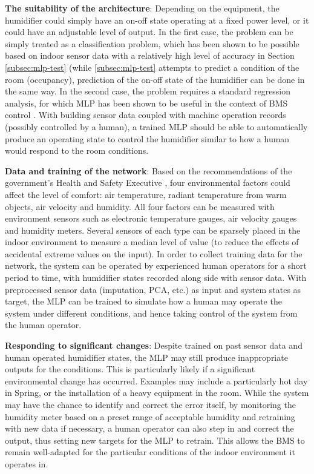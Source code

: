 \documentclass[10pt, oneside]{article}
\begin{document}
\textbf{The suitability of the architecture}: Depending on the equipment, the humidifier could simply have an on-off state operating at a fixed power level, or it could have an adjustable level of output. In the first case, the problem can be simply treated as a classification problem, which has been shown to be possible based on indoor sensor data with a relatively high level of accuracy in Section \ref{subsec:mlp-test} (while \ref{subsec:mlp-test} attempts to predict a condition of the room (occupancy), prediction of the on-off state of the humidifier can be done in the same way. In the second case, the problem requires a standard regression analysis, for which MLP has been shown to be useful in the context of BMS control \cite[Sec. 3.1]{kusiak2011multi}. With building sensor data coupled with machine operation records (possibly controlled by a human), a trained MLP should be able to automatically produce an operating state to control the humidifier similar to how a human would respond to the room conditions.

\textbf{Data and training of the network}: Based on the recommendations of the government's Health and Safety Executive \cite{humidity-factors}, four environmental factors could affect the level of comfort: air temperature, radiant temperature from warm objects, air velocity and humidity. All four factors can be measured with environment sensors such as electronic temperature gauges, air velocity gauges and humidity meters. Several sensors of each type can be sparsely placed in the indoor environment to measure a median level of value (to reduce the effects of accidental extreme values on the input). In order to collect training data for the network, the system can be operated by experienced human operators for a short period to time, with humidifier states recorded along side with sensor data. With preprocessed sensor data (imputation, PCA, etc.) as input and system states as target, the MLP can be trained to simulate how a human may operate the system under different conditions, and hence taking control of the system from the human operator. 

\textbf{Responding to significant changes}: Despite trained on past sensor data and human operated humidifier states, the MLP may still produce inappropriate outputs for the conditions. This is particularly likely if a significant environmental change has occurred. Examples may include a particularly hot day in Spring, or the installation of a heavy equipment in the room. While the system may have the chance to identify and correct the error itself, by monitoring the humidity meter based on a preset range of acceptable humidity and retraining with new data if necessary, a human operator can also step in and correct the output, thus setting new targets for the MLP to retrain. This allows the BMS to remain well-adapted for the particular conditions of the indoor environment it operates in.



\footnotesize{}
\end{document}
